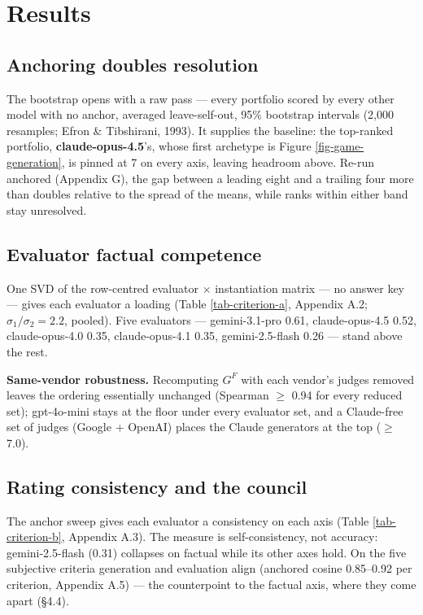 \documentclass{article}
\begin{document}
\section{Results}\label{results}

\subsection{Anchoring doubles resolution}\label{anchoring-doubles-resolution}

The bootstrap opens with a raw pass --- every portfolio scored by every other model with no anchor, averaged leave-self-out, 95\% bootstrap intervals (2,000 resamples; Efron \& Tibshirani, 1993). It supplies the baseline: the top-ranked portfolio, \textbf{claude-opus-4.5}'s, whose first archetype is Figure \ref{fig-game-generation}, is pinned at 7 on every axis, leaving headroom above. Re-run anchored (Appendix G), the gap between a leading eight and a trailing four more than doubles relative to the spread of the means, while ranks within either band stay unresolved.

\subsection{Evaluator factual competence}\label{evaluator-factual-competence}

One SVD of the row-centred evaluator \ensuremath{\times} instantiation matrix --- no answer key --- gives each evaluator a loading (Table \ref{tab-criterion-a}, Appendix A.2; \(\sigma_1/\sigma_2 = 2.2\), pooled). Five evaluators --- gemini-3.1-pro 0.61, claude-opus-4.5 0.52, claude-opus-4.0 0.35, claude-opus-4.1 0.35, gemini-2.5-flash 0.26 --- stand above the rest.

\textbf{Same-vendor robustness.} Recomputing \(G^{F}\) with each vendor's judges removed leaves the ordering essentially unchanged (Spearman \ensuremath{\ge} 0.94 for every reduced set); gpt-4o-mini stays at the floor under every evaluator set, and a Claude-free set of judges (Google + OpenAI) places the Claude generators at the top (\ensuremath{\ge} 7.0).

\subsection{Rating consistency and the council}\label{rating-consistency-and-the-council}

The anchor sweep gives each evaluator a consistency on each axis (Table \ref{tab-criterion-b}, Appendix A.3). The measure is self-consistency, not accuracy: gemini-2.5-flash (0.31) collapses on factual while its other axes hold. On the five subjective criteria generation and evaluation align (anchored cosine 0.85--0.92 per criterion, Appendix A.5) --- the counterpoint to the factual axis, where they come apart (\S{}4.4).
\end{document}
